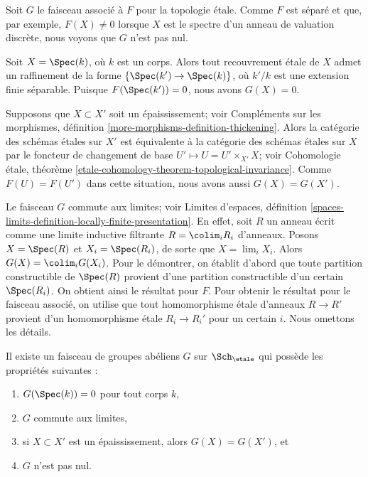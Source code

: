 \medskip\noindent
Soit $G$ le faisceau associé à $F$ pour la topologie \'etale.
Comme $F$ est séparé et que, par exemple, $F(X) \not = 0$ lorsque
$X$ est le spectre d'un anneau de valuation discrète, nous voyons que $G$
n'est pas nul.

\medskip\noindent
Soit $X = \Spec(k)$, où $k$ est un corps.
Alors tout recouvrement \'etale de $X$ admet un raffinement
de la forme $\{\Spec(k') \to \Spec(k)\}$, où $k'/k$
est une extension finie séparable. Puisque $F(\Spec(k')) = 0$,
nous avons $G(X) = 0$.

\medskip\noindent
Supposons que $X \subset X'$ soit un épaississement; voir
Compléments sur les morphismes, définition \ref{more-morphisms-definition-thickening}.
Alors la catégorie des schémas \'etales sur $X'$ est équivalente à la
catégorie des schémas \'etales sur $X$ par le foncteur de changement de base
$U' \mapsto U = U' \times_{X'} X$; voir
Cohomologie \'etale,
théorème \ref{etale-cohomology-theorem-topological-invariance}.
Comme $F(U) = F(U')$ dans cette situation, nous avons aussi $G(X) = G(X')$.

\medskip\noindent
Le faisceau $G$ commute aux limites; voir
Limites d'espaces,
définition \ref{spaces-limits-definition-locally-finite-presentation}.
En effet, soit $R$ un anneau écrit comme une limite inductive filtrante
$R = \colim_i R_i$ d'anneaux. Posons $X = \Spec(R)$ et
$X_i = \Spec(R_i)$, de sorte que $X = \lim_i X_i$. Alors
$G(X) = \colim_i G(X_i)$. Pour le démontrer, on établit d'abord que
toute partition constructible de $\Spec(R)$ provient d'une partition constructible
d'un certain $\Spec(R_i)$. On obtient ainsi le résultat pour $F$. Pour
obtenir le résultat pour le faisceau associé, on utilise que tout homomorphisme \'etale d'anneaux
$R \to R'$ provient d'un homomorphisme \'etale $R_i \to R_i'$ pour un certain $i$.
Nous omettons les détails.

\begin{lemma}
\label{lemma-weird-sheaf}
Il existe un faisceau de groupes abéliens $G$ sur
$\Sch_\etale$ qui possède les propriétés suivantes :
\begin{enumerate}
\item $G(\Spec(k)) = 0$ pour tout corps $k$,
\item $G$ commute aux limites,
\item si $X \subset X'$ est un épaississement, alors $G(X) = G(X')$, et
\item $G$ n'est pas nul.
\end{enumerate}
\end{lemma}

